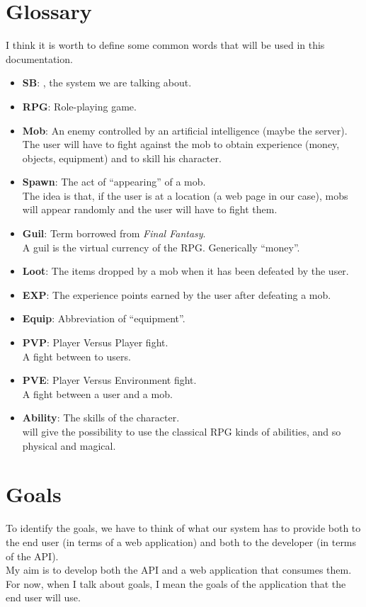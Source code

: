 	\section{Glossary}
	I think it is worth to define some common words that will be used in this documentation.
	\begin{itemize}
		\item \textbf{SB}: \SocialBattle, the system we are talking about.
		\item \textbf{RPG}: Role-playing game.
		\item \textbf{Mob}: An enemy controlled by an artificial intelligence (maybe the server).\\
			The user will have to fight against the mob to obtain experience (money, objects, equipment)
			and to skill his character.
		\item \textbf{Spawn}: The act of ``appearing'' of a mob.\\
			The idea is that, if the user is at a location (a web page in our case), mobs will appear 
			randomly and the user will have to fight them.
		\item \textbf{Guil}: Term borrowed from \textit{Final Fantasy}.\\
			A guil is the virtual currency of the RPG. Generically ``money''.
		\item \textbf{Loot}: The items dropped by a mob when it has been defeated by the user.
		\item \textbf{EXP}: The experience points earned by the user after defeating a mob.
		\item \textbf{Equip}: Abbreviation of ``equipment''.
		\item \textbf{PVP}: Player Versus Player fight.\\
			A fight between to users.
		\item \textbf{PVE}: Player Versus Environment fight.\\
			A fight between a user and a mob.
		\item \textbf{Ability}: The skills of the character.\\
		\SocialBattle will give the possibility to use the classical RPG kinds of abilities, and so physical and magical.
	\end{itemize}

	\section{Goals}
	To identify the goals, we have to think of what our system has to provide both to the end user 
	(in terms of a web application) and both to the developer (in terms of the API).\\
	My aim is to develop both the API and a web application that consumes them.\\
	For now, when I talk about goals, I mean the goals of the application that the end user will use.

